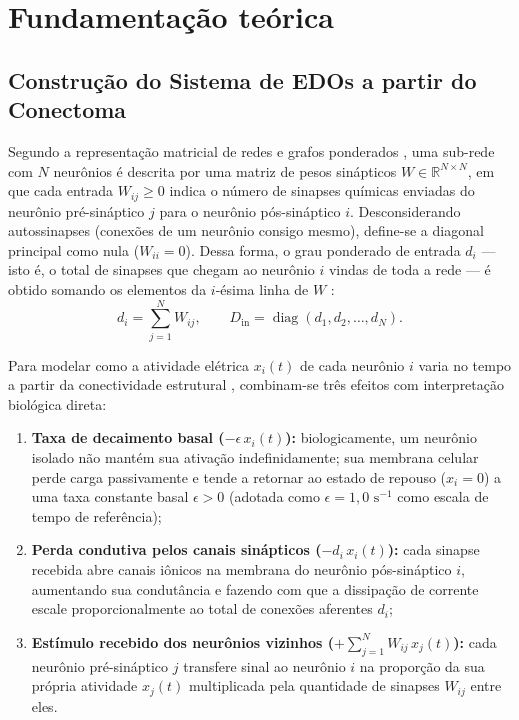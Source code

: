 \documentclass[12pt,a4paper]{article}
\begin{document}
\section{Fundamentação teórica}

\subsection{Construção do Sistema de EDOs a partir do Conectoma}

Segundo a representação matricial de redes e grafos ponderados \cite{strang1997,scheffer2020}, uma sub-rede com $N$ neurônios é descrita por uma matriz de pesos sinápticos $W \in \mathbb{R}^{N \times N}$, em que cada entrada $W_{ij} \ge 0$ indica o número de sinapses químicas enviadas do neurônio pré-sináptico $j$ para o neurônio pós-sináptico $i$. Desconsiderando autossinapses (conexões de um neurônio consigo mesmo), define-se a diagonal principal como nula ($W_{ii} = 0$). Dessa forma, o grau ponderado de entrada $d_i$ --- isto é, o total de sinapses que chegam ao neurônio $i$ vindas de toda a rede --- é obtido somando os elementos da $i$-ésima linha de $W$ \cite{strang1997}:
\begin{equation}
    d_i = \sum_{j=1}^{N} W_{ij}, \qquad D_{\text{in}} = \operatorname{diag}(d_1, d_2, \dots, d_N).
    \label{eq:grau_entrada}
\end{equation}

Para modelar como a atividade elétrica $x_i(t)$ de cada neurônio $i$ varia no tempo a partir da conectividade estrutural \cite{scheffer2020,strang1997}, combinam-se três efeitos com interpretação biológica direta:
\begin{enumerate}
    \item \textbf{Taxa de decaimento basal ($-\epsilon\, x_i(t)$):} biologicamente, um neurônio isolado não mantém sua ativação indefinidamente; sua membrana celular perde carga passivamente e tende a retornar ao estado de repouso ($x_i = 0$) a uma taxa constante basal $\epsilon > 0$ (adotada como $\epsilon = 1{,}0\text{ s}^{-1}$ como escala de tempo de referência);
    \item \textbf{Perda condutiva pelos canais sinápticos ($-d_i\, x_i(t)$):} cada sinapse recebida abre canais iônicos na membrana do neurônio pós-sináptico $i$, aumentando sua condutância e fazendo com que a dissipação de corrente escale proporcionalmente ao total de conexões aferentes $d_i$;
    \item \textbf{Estímulo recebido dos neurônios vizinhos ($+\sum_{j=1}^N W_{ij}\, x_j(t)$):} cada neurônio pré-sináptico $j$ transfere sinal ao neurônio $i$ na proporção da sua própria atividade $x_j(t)$ multiplicada pela quantidade de sinapses $W_{ij}$ entre eles.
\end{enumerate}
\end{document}
